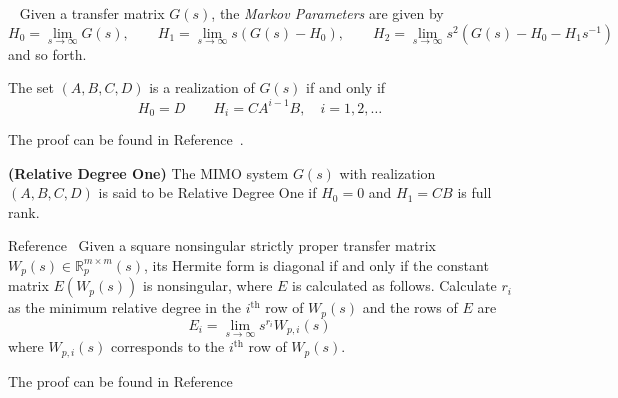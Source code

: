 \documentclass[]{../sty/JGCD}
\theoremstyle{examplestyle}
\begin{document}
  \begin{defn-dan}
   \ \cite{antsaklis.linearsystems.2006}\label{defn.markov}
    Given a transfer matrix $G(s)$, the \textit{Markov Parameters} are given by
    \begin{equation*}
      H_{0}=\lim_{s\rightarrow\infty}G(s),
      \qquad
      H_{1}=\lim_{s\rightarrow\infty}s(G(s)-H_{0}),
      \qquad
      H_{2}=\lim_{s\rightarrow\infty}s^{2}(G(s)-H_{0}-H_{1}s^{-1})
    \end{equation*}
    and so forth.
  \end{defn-dan}

  \begin{thm-dan}\label{thm.markov_realization}
    The set $(A,B,C,D)$ is a realization of $G(s)$ if and only if
    \begin{equation*}
      H_{0}=D
      \qquad
      H_{i}=CA^{i-1}B, \quad i=1,2,\dots
    \end{equation*}
  \end{thm-dan}

  \begin{proof-dan}
    The proof can be found in Reference\ \cite{antsaklis.linearsystems.2006}. %
  \end{proof-dan}

  \begin{defn-dan}
    \textbf{(Relative Degree One)}\label{defn.relativedegreeone}
    The MIMO system $G(s)$ with realization $(A,B,C,D)$ is said to be Relative Degree One if $H_{0}=0$ and $H_{1}=CB$ is full rank.
  \end{defn-dan}

  \begin{lem-dan}\label{lem.E}
    Reference\ \cite{narendra.stable.2005}
    Given a square nonsingular strictly proper transfer matrix $W_{p}(s)\in\mathbb{R}_{p}^{m\times m}(s)$, its Hermite form is diagonal if and only if the constant matrix $E(W_{p}(s))$ is nonsingular, where $E$ is calculated as follows.
    Calculate $r_{i}$ as the minimum relative degree in the $i^{\text{th}}$ row of $W_{p}(s)$ and the rows of $E$ are
    \begin{equation}
      \label{eqn.Ei}
      E_{i}=\lim_{s\rightarrow\infty}s^{r_{i}}W_{p,i}(s)
    \end{equation}
    where $W_{p,i}(s)$ corresponds to the $i^{\text{th}}$ row of $W_{p}(s)$.
  \end{lem-dan}

  \begin{proof-dan}
    The proof can be found in Reference\ \cite{chen.introduction.1970}
  \end{proof-dan}
\end{document}
